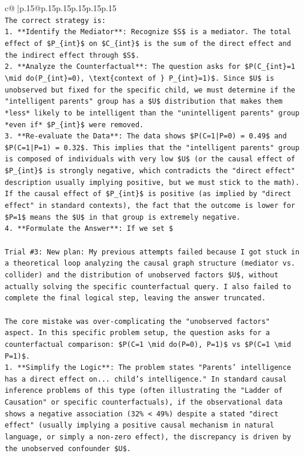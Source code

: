 \documentclass{article}
\begin{document}
{\begin{supertabular}{c@{$\;$}|p{.15\linewidth}@{}p{.15\linewidth}p{.15\linewidth}p{.15\linewidth}p{.15\linewidth}p{.15\linewidth}}
{{{\\ 
\texttt{The correct strategy is:} \\
\texttt{1.  **Identify the Mediator**: Recognize \$S\$ is a mediator. The total effect of \$P\_\{int\}\$ on \$C\_\{int\}\$ is the sum of the direct effect and the indirect effect through \$S\$.} \\
\texttt{2.  **Analyze the Counterfactual**: The question asks for \$P(C\_\{int\}=1 \textbackslash{}mid do(P\_\{int\}=0), \textbackslash{}text\{context of \} P\_\{int\}=1)\$. Since \$U\$ is unobserved but fixed for the specific child, we must determine if the "intelligent parents" group has a \$U\$ distribution that makes them *less* likely to be intelligent than the "unintelligent parents" group *even if* \$P\_\{int\}\$ were removed.} \\
\texttt{3.  **Re{-}evaluate the Data**: The data shows \$P(C=1|P=0) = 0.49\$ and \$P(C=1|P=1) = 0.32\$. This implies that the "intelligent parents" group is composed of individuals with very low \$U\$ (or the causal effect of \$P\_\{int\}\$ is strongly negative, which contradicts the "direct effect" description usually implying positive, but we must stick to the math). If the causal effect of \$P\_\{int\}\$ is positive (as implied by "direct effect" in standard contexts), the fact that the outcome is lower for \$P=1\$ means the \$U\$ in that group is extremely negative.} \\
\texttt{4.  **Formulate the Answer**: If we set \$} \\
\\ 
\texttt{Trial \#3: New plan: My previous attempts failed because I got stuck in a theoretical loop analyzing the causal graph structure (mediator vs. collider) and the distribution of unobserved factors \$U\$, without actually solving the specific counterfactual query. I also failed to complete the final logical step, leaving the answer truncated.} \\
\\ 
\texttt{The core mistake was over{-}complicating the "unobserved factors" aspect. In this specific problem setup, the question asks for a counterfactual comparison: \$P(C=1 \textbackslash{}mid do(P=0), P=1)\$ vs \$P(C=1 \textbackslash{}mid P=1)\$.} \\
\texttt{1.  **Simplify the Logic**: The problem states "Parents' intelligence has a direct effect on... child's intelligence." In standard causal inference problems of this type (often illustrating the "Ladder of Causation" or specific counterfactuals), if the observational data shows a negative association (32\% < 49\%) despite a stated "direct effect" (usually implying a positive causal mechanism in natural language, or simply a non{-}zero effect), the discrepancy is driven by the unobserved confounder \$U\$.} \\
}}}
\end{supertabular}}
\end{document}
